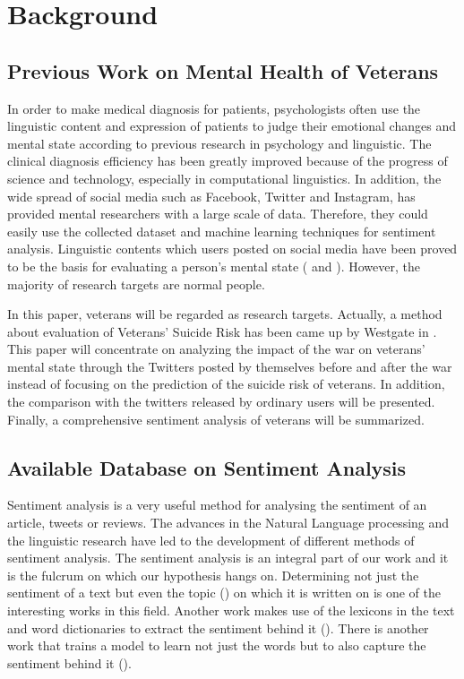 \section{Background}

\subsection{Previous Work on Mental Health of Veterans}

In order to make medical diagnosis for patients, psychologists often use the
linguistic content and expression of patients to judge their emotional changes
and mental state according to previous research in psychology and linguistic.
The clinical diagnosis efficiency has been greatly improved because of the
progress of science and technology, especially in computational linguistics.
In addition, the wide spread of social media such as Facebook, Twitter and
Instagram, has provided mental researchers with a large scale of data.
Therefore, they could easily use the collected dataset and machine learning
techniques for sentiment analysis. Linguistic contents which users posted on
social media have been proved to be the basis for evaluating a person's mental
state (\cite{becauseIwastoldsomuch} and \cite{GUNTUKU201743}). However,
the majority of research targets are normal people.

In this paper, veterans will be regarded as research targets. Actually, a method
about evaluation of Veterans’ Suicide Risk has been came up by Westgate in
\cite{doi:10.1176/appi.ps.201400283}. This paper will concentrate on analyzing
the impact of the war on veterans’ mental state through the Twitters posted by
themselves before and after the war instead of focusing on the prediction of
the suicide risk of veterans. In addition, the comparison with the twitters
released by ordinary users will be presented. Finally, a comprehensive
sentiment analysis of veterans will be summarized.

\subsection{Available Database on Sentiment Analysis}

Sentiment analysis is a very useful method for analysing the sentiment of an
article, tweets or reviews. The advances in the Natural Language processing and
the linguistic research have led to the development of different methods of
sentiment analysis. The sentiment analysis is an integral part of our work and
it is the fulcrum on which our hypothesis hangs on. Determining not just the
sentiment of a text but even the topic (\cite{10.1145/1645953.1646003}) on which
it is written on is one of the interesting works in this field. Another work
makes use of the lexicons in the text and word dictionaries to extract the
sentiment behind it (\cite{10.5555/2002472.2002491}). There is another work that
trains a model to learn not just the words but to also capture the sentiment
behind it (\cite{10.5555/2002472.2002491}). %

